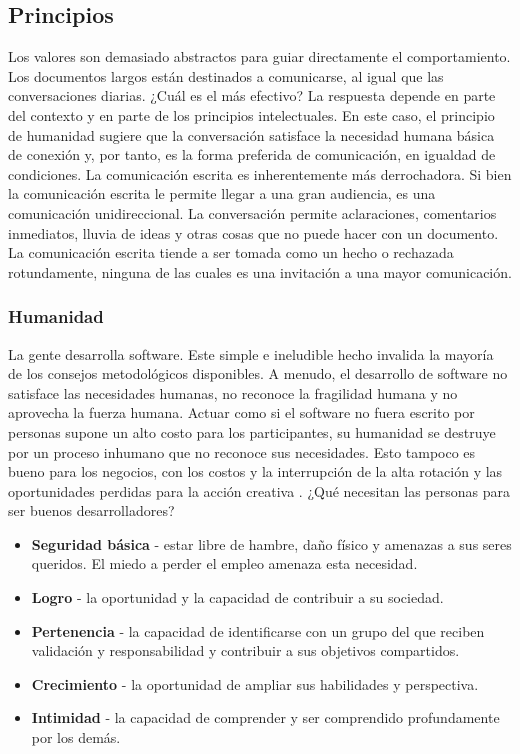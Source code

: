 \begin{spacing}{1.5}
	\subsection{Principios}
		Los valores son demasiado abstractos para guiar directamente el comportamiento. Los documentos largos están destinados a comunicarse, al igual que las conversaciones diarias. ¿Cuál es el más efectivo? La respuesta depende en parte del contexto y en parte de los principios intelectuales. En este caso, el principio de humanidad sugiere que la conversación satisface la necesidad humana básica de conexión y, por tanto, es la forma preferida de comunicación, en igualdad de condiciones. La comunicación escrita es inherentemente más derrochadora. Si bien la comunicación escrita le permite llegar a una gran audiencia, es una comunicación unidireccional. La conversación permite aclaraciones, comentarios inmediatos, lluvia de ideas y otras cosas que no puede hacer con un documento. La comunicación escrita tiende a ser tomada como un hecho o rechazada rotundamente, ninguna de las cuales es una invitación a una mayor comunicación.
		\subsubsection{Humanidad}
			La gente desarrolla software. Este simple e ineludible hecho invalida la mayoría de los consejos metodológicos disponibles. A menudo, el desarrollo de software no satisface las necesidades humanas, no reconoce la fragilidad humana y no aprovecha la fuerza humana. Actuar como si el software no fuera escrito por personas supone un alto costo para los participantes, su humanidad se destruye por un proceso inhumano que no reconoce sus necesidades. Esto tampoco es bueno para los negocios, con los costos y la interrupción de la alta rotación y las oportunidades perdidas para la acción creativa \cite{chap2_extreme_programming}.
			¿Qué necesitan las personas para ser buenos desarrolladores?\\
			\begin{itemize}
				\item \textbf{Seguridad básica} - estar libre de hambre, daño físico y amenazas a sus seres queridos. El miedo a perder el empleo amenaza esta necesidad.
				\item \textbf{Logro} - la oportunidad y la capacidad de contribuir a su sociedad.
				\item \textbf{Pertenencia} - la capacidad de identificarse con un grupo del que reciben validación y responsabilidad y contribuir a sus objetivos compartidos.
				\item \textbf{Crecimiento} - la oportunidad de ampliar sus habilidades y perspectiva.
				\item \textbf{Intimidad} - la capacidad de comprender y ser comprendido profundamente por los demás.
			\end{itemize}

\end{spacing}

